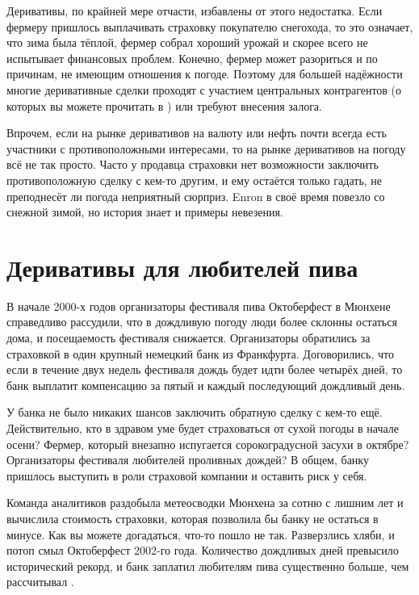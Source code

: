 Деривативы, по крайней мере отчасти, избавлены от этого недостатка. Если фермеру
пришлось выплачивать страховку покупателю снегохода, то это означает, что зима
была тёплой, фермер собрал хороший урожай и скорее всего не испытывает финансовых
проблем. Конечно, фермер может разориться и по причинам, не имеющим отношения к
погоде. Поэтому для большей надёжности многие деривативные сделки проходят с
участием центральных контрагентов (о которых вы можете прочитать в )
или требуют внесения залога.

Впрочем, если на рынке деривативов на валюту или нефть почти всегда есть участники с
противоположными интересами, то на рынке деривативов на погоду всё не так просто.
Часто у продавца страховки нет возможности заключить противоположную сделку с кем-то другим,
и ему остаётся только гадать, не преподнесёт ли погода неприятный сюрприз. Enron
в своё время повезло со снежной зимой, но история знает и примеры невезения.

\section*{Деривативы для любителей пива}

В начале 2000-х годов организаторы фестиваля пива Октоберфест в Мюнхене справедливо
рассудили, что в дождливую погоду люди более склонны остаться дома, и посещаемость
фестиваля снижается. Организаторы обратились за страховкой в один крупный немецкий банк из Франкфурта. Договорились, что если в течение двух недель
фестиваля дождь будет идти более четырёх дней, то банк выплатит компенсацию за пятый
и каждый последующий дождливый день.
 
У банка не было никаких шансов заключить обратную сделку с кем-то ещё.
Действительно, кто в здравом уме будет страховаться от сухой погоды в начале
осени? Фермер, который внезапно испугается сорокоградусной засухи в октябре?
Организаторы фестиваля любителей проливных дождей? В общем, банку пришлось
выступить в роли страховой компании и оставить риск у себя.

Команда аналитиков раздобыла метеосводки Мюнхена за сотню с лишним лет и
вычислила стоимость страховки, которая позволила бы банку не остаться в минусе.
Как вы можете догадаться, что-то пошло не так. Разверзлись хляби, и потоп смыл
Октоберфест 2002-го года. Количество дождливых дней превысило исторический рекорд,
и банк заплатил любителям пива существенно больше, чем рассчитывал \cite[p.~160]{rodgers2016why}.

